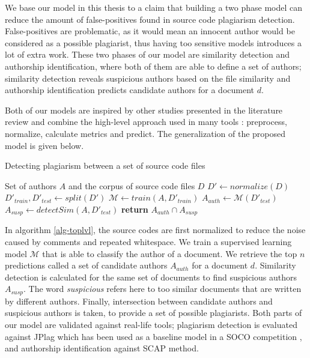 
We base our model in this thesis to a claim that building a two phase model can reduce the amount of false-positives found in source code plagiarism detection. False-positives are problematic, as it would mean an innocent author would be considered as a possible plagiarist, thus having too sensitive models introduces a lot of extra work. These two phases of our model are similarity detection and authorship identification, where both of them are able to define a set of authors; similarity detection reveals suspicious authors based on the file similarity and authorship identification predicts candidate authors for a document $d$. 


Both of our models are inspired by other studies presented in the literature review and combine the high-level approach used in many tools \cite{RSCAD2016}: preprocess, normalize, calculate metrics and predict. The generalization of the proposed model is given below.

\begin{algorithm}[ht]
\caption{Detecting plagiarism between a set of source code files}
\label{alg-toplvl}
\begin{algorithmic}

\Require Set of authors $A$ and the corpus of source code files $D$
   \State $D'\gets normalize(D)$
   \State $D'_{train}, D'_{test} \gets split(D')$
   \State $\mathcal{M} \gets train(A, D'_{train})$
   \State $A_{auth} \gets \mathcal{M}(D'_{test})$
   \State $A_{susp} \gets detectSim(A, D'_{test})$
   \State \textbf{return} $A_{auth} \cap A_{susp}$
\EndProcedure

\end{algorithmic}
\end{algorithm}

\noindent
In algorithm \ref{alg-toplvl}, the source codes are first normalized to reduce the noise caused by \eg comments and repeated whitespace. We train a supervised learning model $\mathcal{M}$ that is able to classify the author of a document. We retrieve the top $n$ predictions called a set of candidate authors $A_{auth}$ for a document $d$. Similarity detection is calculated for the same set of documents to find suspicious authors $A_{susp}$. The word \emph{suspicious} refers here to too similar documents that are written by different authors. Finally, intersection between candidate authors and suspicious authors is taken, to provide a set of possible plagiarists. Both parts of our model are validated against real-life tools; plagiarism detection is evaluated against JPlag \cite{prechelt2002finding} which has been used as a baseline model in a SOCO competition \cite{saez2014pan}, and authorship identification against SCAP method.

